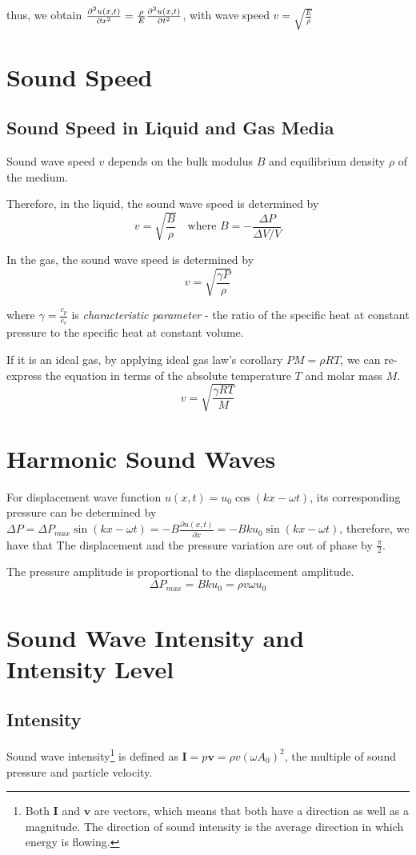 \documentclass[UTF8]{book}
\begin{document}
thus, we obtain ${\partial^2 u(x,t) \over \partial x^2 }={ \rho\over E}{\partial^2 u(x,t) \over \partial t^2}$, with wave speed $v=\sqrt{\frac{E}{\rho}}$


\section{Sound Speed}


\subsection{Sound Speed in Liquid and Gas Media}
Sound wave speed $v$ depends on the bulk modulus $B$ and equilibrium density $\rho $ of the medium.

Therefore, in the liquid, the sound wave speed is determined by
\[v=\sqrt{\frac{B}{\rho }}\quad \text{where }B=-\frac{\Delta P}{\Delta V/V}\]

In the gas, the sound wave speed is determined by
\[v=\sqrt{\frac{\gamma P}{\rho}}\]

where $\gamma =\frac{c_p}{c_v}$ is \emph{characteristic parameter} - the ratio of the specific heat at constant pressure to the specific heat at constant volume. 

If it is an ideal gas, by applying ideal gas law's corollary $PM=\rho RT$, we can re-express the equation in terms of the absolute temperature $T$ and molar mass $M$.
\[v=\sqrt{\frac{\gamma RT}{M}}\]


\section{Harmonic Sound Waves}
For displacement wave function $u(x,t)=u_0\cos (kx-\omega t)$, its corresponding pressure can be determined by $\Delta P=\Delta P_{max}\sin (kx-\omega t)=-B\frac{\partial u(x,t)}{\partial x}=-Bku_0\sin (kx-\omega t)$, therefore, we have that The displacement and the pressure variation are out of phase by $\frac{\pi }{2}$.

The pressure amplitude is proportional to the displacement amplitude.
\[\Delta P_{max}=Bku_0=\rho v\omega u_0\]


\section{Sound Wave Intensity and Intensity Level}
\subsection{Intensity}
Sound wave intensity\footnote{Both $\mathbf{I}$ and $\mathbf{v}$ are vectors, which means that both have a direction as well as a magnitude. The direction of sound intensity is the average direction in which energy is flowing.} is defined as $\mathbf{I}=p\mathbf{v}=\rho v(\omega A_0)^2$, the multiple of sound pressure and particle velocity. 
\end{document}
